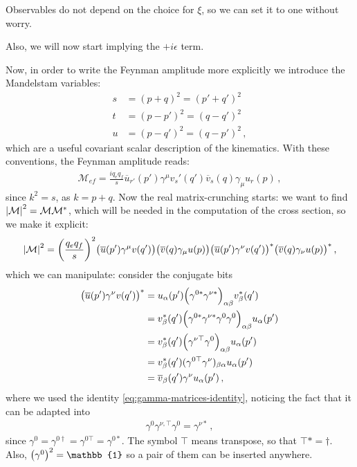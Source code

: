 \documentclass[main.tex]{subfiles}
\begin{document}
Observables do not depend on the choice for \(\xi \), so we can set it to one without worry. 


Also, we will now start implying the \(+i \epsilon \) term.

Now, in order to write the Feynman amplitude more explicitly we introduce the Mandelstam variables: 
%
\begin{align}
s &= (p+q)^2 = (p' + q')^2 \\
t &= (p-p')^2 = (q - q')^2 \\
u &= (p-q')^2 = (q - p')^2 
\,,
\end{align}
%
which are a useful covariant scalar description of the kinematics. 
With these conventions, the Feynman amplitude reads: 
%
\begin{align}
\mathcal{M}_{ef} = \frac{i q_e q_f}{s} 
\overline{u}_{r'} (p') \gamma^{\mu } v_s' (q')
\overline{v}_{s} (q) \gamma_{\mu} u_r (p)
\,,
\end{align}
%
since \(k^2 = s\), as \(k = p+q\).
Now the real matrix-crunching starts: we want to find \(\abs{\mathcal{M}}^2 = \mathcal{M} \mathcal{M}^{*}\), which will be needed in the computation of the cross section, so we make it explicit: 
%
\begin{align}
\abs{\mathcal{M}}^2 = \qty(\frac{q_e q_f}{s})^2 
\qty(\overline{u} (p') \gamma^{\mu } v (q')) \qty(\overline{v}(q) \gamma_{\mu } u(p)) 
\qty(\overline{u} (p') \gamma^{\nu } v (q'))^{*} \qty(\overline{v}(q) \gamma_{\nu } u(p))^{*}
\,,
\end{align}
%
which we can manipulate: consider the conjugate bits
%
\begin{align}
\qty(\overline{u} (p') \gamma^{\nu } v (q'))^{*} 
&= u_{\alpha }(p') \qty( \gamma^{0 *} \gamma^{\nu *})_{\alpha \beta } v^{*}_{\beta } (q')  \\
&= v^{*}_{\beta }(q')\qty( \gamma^{0 *} \gamma^{\nu *} \gamma^{0} \gamma^{0})_{\alpha \beta }
u_\alpha (p')    \\
&= v^{*}_{\beta }(q')\qty( \gamma^{\nu \top} \gamma^{0})_{\alpha \beta }
u_\alpha (p')  \\
&= v^{*}_{\beta } (q') (\gamma^{0 \top} \gamma^{\nu })_{\beta \alpha } u_\alpha (p')  \\
&= \overline{v}_{\beta } (q') \gamma^{\nu  } u_\alpha (p')
\,,
\end{align}
%
where we used the identity \eqref{eq:gamma-matrices-identity}, noticing the fact that it can be adapted into 
%
\begin{align}
\gamma^{0} \gamma^{\nu , \top} \gamma^{0} = \gamma^{\nu *}
\,,
\end{align}
%
since \(\gamma^{0} = \gamma^{0 \dag} = \gamma^{0 \top} = \gamma^{0 *}\). The symbol \(\top\) means transpose, so that \(\top * = \dag\). Also, \(\qty(\gamma^{0})^2 = \mathbb{1}\) so a pair of them can be inserted anywhere.
\end{document}
